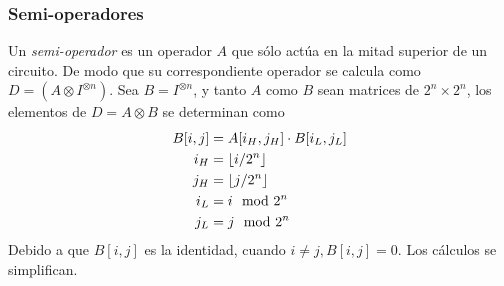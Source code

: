 \begin{ejemplo}
\subsubsection{Semi-operadores}
Un \textit{semi-operador} es un operador $A$ que sólo actúa en la mitad superior
de un circuito. De modo que su correspondiente operador se calcula como $D = (A 
\otimes I^{\otimes n})$. Sea $B = I^{\otimes n}$, y tanto $A$ como $B$ sean 
matrices de $2^n\times 2^n$, los elementos de $D = A \otimes B$ se determinan 
como
\begin{equation}
\begin{split}
	B[i,j] &= A[i_H, j_H] \cdot B[i_L, j_L]\\
	i_H &= \lfloor i/2^n \rfloor \\
	j_H &= \lfloor j/2^n \rfloor \\
	i_L &= i \mod 2^n \\
	j_L &= j \mod 2^n \\
\end{split}
\end{equation}
Debido a que $B[i, j]$ es la identidad, cuando $i \neq j, B[i,j] = 0$. Los 
cálculos se simplifican.


\end{ejemplo}
